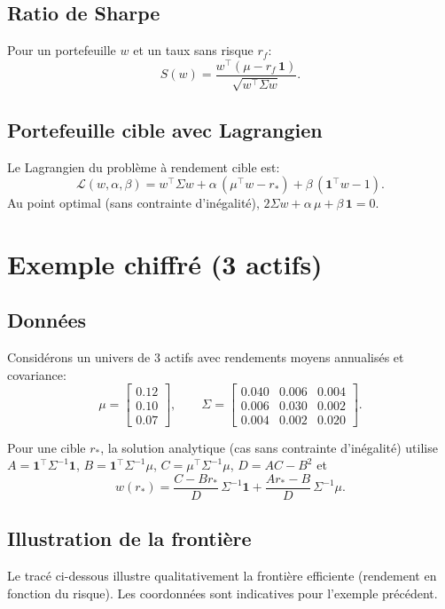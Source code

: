 \documentclass[11pt,a4paper]{article}
\begin{document}
\subsection{Ratio de Sharpe}
Pour un portefeuille $w$ et un taux sans risque $r_f$:
\[
S(w) = \frac{w^\top (\mu - r_f\,\mathbf{1})}{\sqrt{w^\top \Sigma w}}.
\]

\subsection{Portefeuille cible avec Lagrangien}
Le Lagrangien du probl\`eme \`a rendement cible est:
\[
\mathcal{L}(w, \alpha, \beta) = w^\top \Sigma w + \alpha\,(\mu^\top w - r_*) + \beta\,(\mathbf{1}^\top w - 1).
\]
Au point optimal (sans contrainte d'in\'egalit\'e), $2\Sigma w + \alpha\,\mu + \beta\,\mathbf{1} = 0$.

\section{Exemple chiffr\'e (3 actifs)}
\subsection{Donn\'ees}
Consid\'erons un univers de 3 actifs avec rendements moyens annualis\'es et covariance:
\[
\mu = \begin{bmatrix} 0.12 \\ 0.10 \\ 0.07 \end{bmatrix},\qquad
\Sigma = \begin{bmatrix}
0.040 & 0.006 & 0.004 \\
0.006 & 0.030 & 0.002 \\
0.004 & 0.002 & 0.020
\end{bmatrix}.
\]

Pour une cible $r_*$, la solution analytique (cas sans contrainte d'in\'egalit\'e) utilise $A=\mathbf{1}^\top\Sigma^{-1}\mathbf{1}$, $B=\mathbf{1}^\top\Sigma^{-1}\mu$, $C=\mu^\top\Sigma^{-1}\mu$, $D=AC-B^2$ et
\[
w(r_*) = \frac{C - B r_*}{D}\,\Sigma^{-1}\mathbf{1} + \frac{A r_* - B}{D}\,\Sigma^{-1}\mu.
\]

\subsection{Illustration de la fronti\`ere}
Le trac\'e ci-dessous illustre qualitativement la fronti\`ere efficiente (rendement en fonction du risque). Les coordonn\'ees sont indicatives pour l'exemple pr\'ec\'edent.
\end{document}
